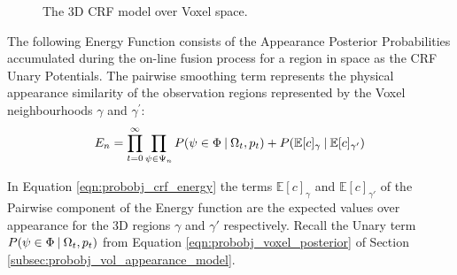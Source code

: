 \begin{figure}[h]
{
  }
  \caption[3D CRF over Voxels]
  {The 3D CRF model over Voxel space.}
\end{figure}

The following Energy Function consists of the Appearance Posterior Probabilities
accumulated during the on-line fusion process for a region in space as the
CRF Unary Potentials. The pairwise smoothing term represents the physical
appearance similarity of the observation regions represented by the
Voxel neighbourhoods $\gamma$ and $\gamma^{'}$:
\begin{equation}
  \label{eqn:probobj_crf_energy}
  E_{n} = \prod_{t=0}^{\infty} \prod_{\psi \in \Psi_{n}}
  P(\psi \in \Phi \:\vert\: \Omega_{t}, p_{t}) +
  P(\mathbb{E}[c]_{\gamma} \:\vert\: \mathbb{E}[c]_{\gamma'})
\end{equation}

In Equation \ref{eqn:probobj_crf_energy} the terms $\mathbb{E}[c]_{\gamma}$ and
$\mathbb{E}[c]_{\gamma'}$ of the Pairwise component of the Energy function  are
the expected values over appearance for the 3D regions $\gamma$ and $\gamma'$
respectively. Recall the Unary term $P(\psi \in \Phi \:\vert\: \Omega_{t}, p_{t})$
from Equation \ref{eqn:probobj_voxel_posterior} of Section
\ref{subsec:probobj_vol_appearance_model}.

